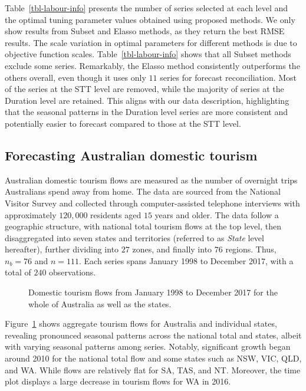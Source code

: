 \documentclass[
  11pt]{article}
\theoremstyle{plain}
\theoremstyle{remark}
\begin{document}
Table~\ref{tbl-labour-info} presents the number of series selected at
each level and the optimal tuning parameter values obtained using
proposed methods. We only show results from Subset and Elasso methods,
as they return the best RMSE results. The scale variation in optimal
parameters for different methods is due to objective function scales.
Table~\ref{tbl-labour-info} shows that all Subset methods exclude some
series. Remarkably, the Elasso method consistently outperforms the
others overall, even though it uses only \(11\) series for forecast
reconciliation. Most of the series at the STT level are removed, while
the majority of series at the Duration level are retained. This aligns
with our data description, highlighting that the seasonal patterns in
the Duration level series are more consistent and potentially easier to
forecast compared to those at the STT level.

\subsection{Forecasting Australian domestic tourism}\label{sec-tourism}

Australian domestic tourism flows are measured as the number of
overnight trips Australians spend away from home. The data are sourced
from the National Visitor Survey and collected through computer-assisted
telephone interviews with approximately \(120,000\) residents aged
\(15\) years and older. The data follow a geographic structure, with
national total tourism flows at the top level, then disaggregated into
seven states and territories (referred to as \emph{State} level
hereafter), further dividing into \(27\) zones, and finally into \(76\)
regions. Thus, \(n_b=76\) and \(n=111\). Each series spans January 1998
to December 2017, with a total of \(240\) observations.

\begin{figure}


\caption{\label{fig-tourism-data}Domestic tourism flows from January
1998 to December 2017 for the whole of Australia as well as the states.}

\end{figure}%

Figure~\ref{fig-tourism-data} shows aggregate tourism flows for
Australia and individual states, revealing pronounced seasonal patterns
across the national total and states, albeit with varying seasonal
patterns among series. Notably, significant growth began around 2010 for
the national total flow and some states such as NSW, VIC, QLD, and WA.
While flows are relatively flat for SA, TAS, and NT. Moreover, the time
plot displays a large decrease in tourism flows for WA in 2016.
\end{document}
